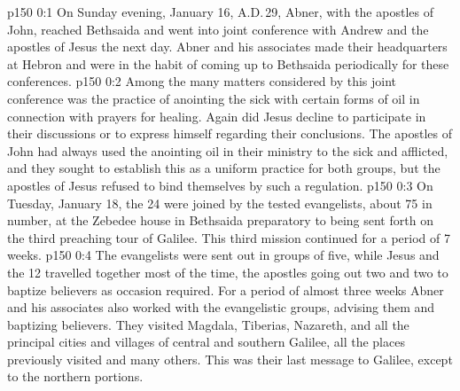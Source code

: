 \author{Midwayer Commission}
\vs p150 0:1 On Sunday evening, January 16, A.D.\,29, Abner, with the apostles of John, reached Bethsaida and went into joint conference with Andrew and the apostles of Jesus the next day. Abner and his associates made their headquarters at Hebron and were in the habit of coming up to Bethsaida periodically for these conferences.
\vs p150 0:2 Among the many matters considered by this joint conference was the practice of anointing the sick with certain forms of oil in connection with prayers for healing. Again did Jesus decline to participate in their discussions or to express himself regarding their conclusions. The apostles of John had always used the anointing oil in their ministry to the sick and afflicted, and they sought to establish this as a uniform practice for both groups, but the apostles of Jesus refused to bind themselves by such a regulation.
\vs p150 0:3 \pc On Tuesday, January 18, the 24 were joined by the tested evangelists, about 75 in number, at the Zebedee house in Bethsaida preparatory to being sent forth on the third preaching tour of Galilee. This third mission continued for a period of 7 weeks.
\vs p150 0:4 The evangelists were sent out in groups of five, while Jesus and the 12 travelled together most of the time, the apostles going out two and two to baptize believers as occasion required. For a period of almost three weeks Abner and his associates also worked with the evangelistic groups, advising them and baptizing believers. They visited Magdala, Tiberias, Nazareth, and all the principal cities and villages of central and southern Galilee, all the places previously visited and many others. This was their last message to Galilee, except to the northern portions.
